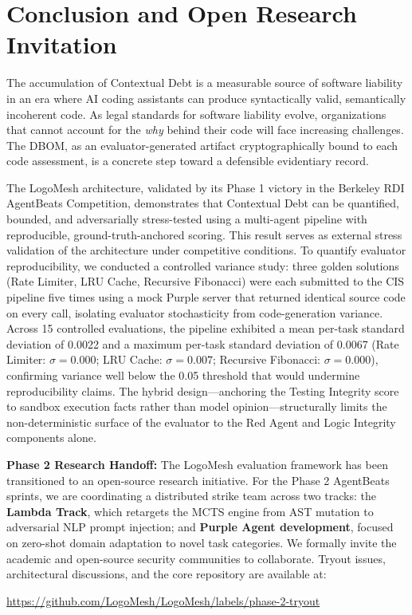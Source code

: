 \documentclass[11pt, a4paper]{article}
\begin{document}
\section{Conclusion and Open Research Invitation}

The accumulation of Contextual Debt is a measurable source of software liability in an era where AI coding assistants can produce syntactically valid, semantically incoherent code. As legal standards for software liability evolve, organizations that cannot account for the \emph{why} behind their code will face increasing challenges. The DBOM, as an evaluator-generated artifact cryptographically bound to each code assessment, is a concrete step toward a defensible evidentiary record.

The LogoMesh architecture, validated by its Phase 1 victory in the Berkeley RDI AgentBeats Competition, demonstrates that Contextual Debt can be quantified, bounded, and adversarially stress-tested using a multi-agent pipeline with reproducible, ground-truth-anchored scoring. This result serves as external stress validation of the architecture under competitive conditions. To quantify evaluator reproducibility, we conducted a controlled variance study: three golden solutions (Rate Limiter, LRU Cache, Recursive Fibonacci) were each submitted to the CIS pipeline five times using a mock Purple server that returned identical source code on every call, isolating evaluator stochasticity from code-generation variance. Across 15 controlled evaluations, the pipeline exhibited a mean per-task standard deviation of 0.0022 and a maximum per-task standard deviation of 0.0067 (Rate Limiter: $\sigma = 0.000$; LRU Cache: $\sigma = 0.007$; Recursive Fibonacci: $\sigma = 0.000$), confirming variance well below the 0.05 threshold that would undermine reproducibility claims. The hybrid design—anchoring the Testing Integrity score to sandbox execution facts rather than model opinion—structurally limits the non-deterministic surface of the evaluator to the Red Agent and Logic Integrity components alone.

\textbf{Phase 2 Research Handoff:} The LogoMesh evaluation framework has been transitioned to an open-source research initiative. For the Phase 2 AgentBeats sprints, we are coordinating a distributed strike team across two tracks: the \textbf{Lambda Track}, which retargets the MCTS engine from AST mutation to adversarial NLP prompt injection; and \textbf{Purple Agent development}, focused on zero-shot domain adaptation to novel task categories. We formally invite the academic and open-source security communities to collaborate. Tryout issues, architectural discussions, and the core repository are available at:

\begin{center}
\url{https://github.com/LogoMesh/LogoMesh/labels/phase-2-tryout}
\end{center}
\end{document}
